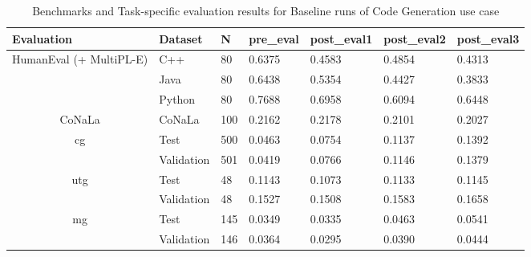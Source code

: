 \begin{table}[H]
\centering
\caption{Benchmarks and Task-specific evaluation results for Baseline runs of Code Generation use case}
\begin{tabular}{|c|l|l|l|l|l|l|}
\hline
\multicolumn{1}{|l|}{\textbf{Evaluation}}  & \textbf{Dataset} & \textbf{N} & \textbf{pre\_eval} & \textbf{post\_eval1} & \textbf{post\_eval2} & \textbf{post\_eval3} \\ \hline
\multirow{3}{*}{HumanEval   (+ MultiPL-E)} & C++              & 80         & 0.6375             & 0.4583               & 0.4854               & 0.4313               \\ \cline{2-7} 
                                           & Java             & 80         & 0.6438             & 0.5354               & 0.4427               & 0.3833               \\ \cline{2-7} 
                                           & Python           & 80         & 0.7688             & 0.6958               & 0.6094               & 0.6448               \\ \hline
CoNaLa                                     & CoNaLa           & 100        & 0.2162             & 0.2178               & 0.2101               & 0.2027               \\ \hline
\multirow{2}{*}{cg}                        & Test             & 500        & 0.0463             & 0.0754               & 0.1137               & 0.1392               \\ \cline{2-7} 
                                           & Validation       & 501        & 0.0419             & 0.0766               & 0.1146               & 0.1379               \\ \hline
\multirow{2}{*}{utg}                       & Test             & 48         & 0.1143             & 0.1073               & 0.1133               & 0.1145               \\ \cline{2-7} 
                                           & Validation       & 48         & 0.1527             & 0.1508               & 0.1583               & 0.1658               \\ \hline
\multirow{2}{*}{mg}                        & Test             & 145        & 0.0349             & 0.0335               & 0.0463               & 0.0541               \\ \cline{2-7} 
                                           & Validation       & 146        & 0.0364             & 0.0295               & 0.0390               & 0.0444               \\ \hline
\end{tabular}
\label{tab:CodeBaselineCombined}
\end{table}


